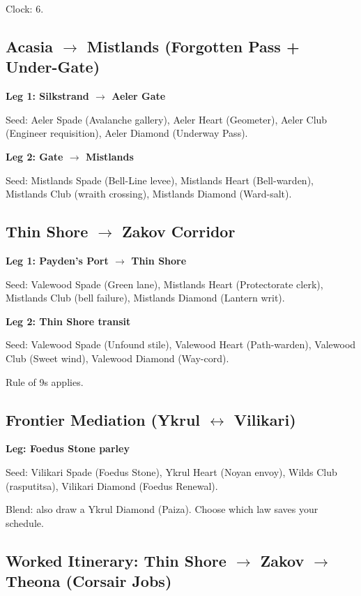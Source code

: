 \documentclass[11pt,letterpaper,twoside]{book}
\begin{document}
Clock: 6.

\subsection{Acasia $\rightarrow$ Mistlands (Forgotten Pass + Under-Gate)}

\textbf{Leg 1: Silkstrand $\rightarrow$ Aeler Gate}

Seed: Aeler Spade (Avalanche gallery), Aeler Heart (Geometer), Aeler Club (Engineer requisition), Aeler Diamond (Underway Pass).

\textbf{Leg 2: Gate $\rightarrow$ Mistlands}

Seed: Mistlands Spade (Bell-Line levee), Mistlands Heart (Bell-warden), Mistlands Club (wraith crossing), Mistlands Diamond (Ward-salt).

\subsection{Thin Shore $\rightarrow$ Zakov Corridor}

\textbf{Leg 1: Payden's Port $\rightarrow$ Thin Shore}

Seed: Valewood Spade (Green lane), Mistlands Heart (Protectorate clerk), Mistlands Club (bell failure), Mistlands Diamond (Lantern writ).

\textbf{Leg 2: Thin Shore transit}

Seed: Valewood Spade (Unfound stile), Valewood Heart (Path-warden), Valewood Club (Sweet wind), Valewood Diamond (Way-cord).

Rule of 9s applies.

\subsection{Frontier Mediation (Ykrul $\leftrightarrow$ Vilikari)}

\textbf{Leg: Foedus Stone parley}

Seed: Vilikari Spade (Foedus Stone), Ykrul Heart (Noyan envoy), Wilds Club (rasputitsa), Vilikari Diamond (Foedus Renewal).

Blend: also draw a Ykrul Diamond (Paiza). Choose which law saves your schedule.

\subsection{Worked Itinerary: Thin Shore $\rightarrow$ Zakov $\rightarrow$ Theona (Corsair Jobs)}
\end{document}
